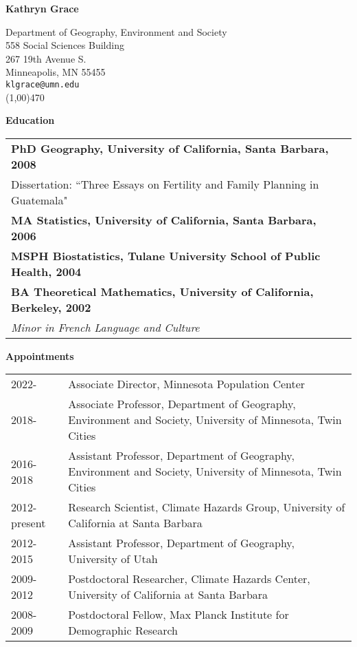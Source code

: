 \documentclass[11pt]{article} %
\begin{document}
\centerline{\Large\textbf{Kathryn Grace}}  

\bigskip
\noindent 
Department of Geography, Environment and Society\\
558 Social Sciences Building\\
267 19th Avenue S.\\
Minneapolis, MN 55455\\
   {\tt klgrace@umn.edu} \\
\noindent
\line(1,00){470}
\bigskip




\noindent
\textbf{Education}


\noindent
\begin{tabular}{lp{12cm}}
 \textbf{PhD Geography, University of California, Santa Barbara, 2008}\\
 Dissertation: ``Three Essays on Fertility and Family Planning in Guatemala"\\
\textbf {MA Statistics, University of California, Santa Barbara, 2006}\\
\textbf {MSPH Biostatistics, Tulane University School of Public Health, 2004}\\
\textbf {BA Theoretical Mathematics, University of California, Berkeley, 2002}\\
{\it Minor in French Language and Culture}\\
\end{tabular}

\vspace{.5 cm}


\noindent
\textbf{Appointments}


\noindent
\begin{tabular}{lp{12cm}}
2022- &Associate Director, Minnesota Population Center\\
2018-  & Associate Professor, Department of Geography, Environment and Society, University of Minnesota, Twin Cities\\
2016- 2018 & Assistant Professor, Department of Geography, Environment and Society, University of Minnesota, Twin Cities\\
2012-present & Research Scientist, Climate Hazards Group, University of California at Santa Barbara \\
2012-2015 & Assistant Professor, Department of Geography, University of Utah \\
2009-2012 & Postdoctoral Researcher, Climate Hazards Center, University of California at Santa Barbara \\
2008-2009 & Postdoctoral Fellow, Max Planck Institute for Demographic Research \\
\end{tabular}
\end{document}
